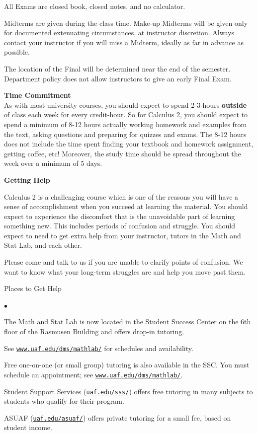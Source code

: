 \documentclass[12pt]{article}
\renewcommand{\emph}[1]{\textsf{\textbf{#1}}}
\newcommand{\localhead}[1]{\par\smallskip\textbf{#1} \smallskip\nobreak\\}%
\def\heading#1{\localhead{\large\emph{#1}}}
\newenvironment{clist}%
{\bgroup\parskip 0pt\begin{list}{$\bullet$}{\partopsep 4pt\topsep 0pt\itemsep -2pt}}%
{\end{list}\egroup}%
\begin{document}
All Exams are closed book, closed notes, and no calculator.

Midterms are given during the class time. Make-up Midterms will be given only for documented extenuating circumstances, at instructor discretion. Always contact your instructor if you will miss a Midterm, ideally as far in advance as possible.

The location of the Final will be determined near the end of the semester. Department policy does not allow instructors to give an early Final Exam.

\heading{Time Commitment}

\vspace*{-.3in}
As with most university courses, you should expect to spend 2-3 hours \textbf{outside} of class each week for every credit-hour. So for Calculus 2, you should expect to spend a minimum of 8-12 hours actually working homework and examples from the text, asking questions and preparing for quizzes and exams. The 8-12 hours does not include the time spent finding your textbook and homework assignment, getting coffee, etc! Moreover, the study time should be spread throughout the week over a minimum of 5 days.

\heading{Getting Help}
\vspace*{-.3in}

Calculus 2 is a challenging course which is one of the reasons you will have a sense of accomplishment when you succeed at learning the material. You should expect to experience the discomfort that is the unavoidable part of learning something new. This includes periods of confusion and struggle. You should expect to need to get extra help from your instructor, tutors in the Math and Stat Lab, and each other. 

Please come and talk to us if you are unable to clarify points of confusion. We want to know what your long-term struggles are and help you move past them.

Places to Get Help

\vskip -20pt\strut
\begin{clist}
    \item The Math and Stat Lab is now located in the
      Student Success Center on the 6th floor of the Rasmusen Building and
      offers drop-in tutoring.

	See \href{http://www.uaf.edu/dms/mathlab/}{\texttt{www.uaf.edu/dms/mathlab/}} for schedules and availability.
	\item Free
one-on-one (or small group) tutoring is also available in 
the SSC. You must schedule an
appointment; see \href{http://www.uaf.edu/dms/mathlab/}{\texttt{www.uaf.edu/dms/mathlab/}}.
	\item Student Support Services (\href{https://uaf.edu/sss/}{\texttt{uaf.edu/sss/}}) offers free tutoring in many subjects to students who qualify for their program.
	\item ASUAF (\href{https://uaf.edu/asuaf/}{\texttt{uaf.edu/asuaf/}}) offers private tutoring for a small fee, based on student income.
\end{clist}
\end{document}
